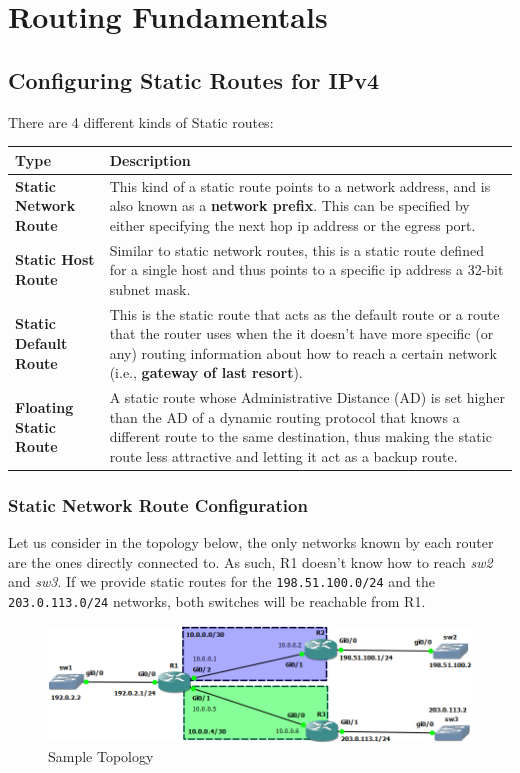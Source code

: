 \chapter{Routing Fundamentals}
\section{Configuring Static Routes for IPv4}
There are 4 different kinds of Static routes:

\vspace{-10pt}
\noindent
\begin{center}
	\begin{tabular}{lm{}}
		\toprule
		\textbf{Type} &\textbf{Description} \\
		\midrule
		\textbf{Static Network Route}	&This kind of a static route points to a network address, and is also known as a \textbf{network prefix}. This can be specified by either specifying the next hop ip address or the egress port.\\
		\textbf{Static Host Route}		&Similar to static network routes, this is a static route defined for a single host and thus points to a specific ip address a 32-bit subnet mask. \\
		\textbf{Static Default Route}	&This is the static route that acts as the default route or a route that the router uses when the it doesn't have more specific (or any) routing information about how to reach a certain network (i.e., \textbf{gateway of last resort}). \\
		\textbf{Floating Static Route}	&A static route whose Administrative Distance (AD) is set higher than the AD of a dynamic routing protocol that knows a different route to the same destination, thus making the static route less attractive and letting it act as a backup route.\\		
		\bottomrule
	\end{tabular}
\end{center}

\subsection{Static Network Route Configuration}
Let us consider in the topology below, the only networks known by each router are the ones directly connected to. As such, R1 doesn't know how to reach \textit{sw2} and \textit{sw3}. If we provide static routes for the \verb|198.51.100.0/24| and the \verb|203.0.113.0/24| networks, both switches will be reachable from R1. 
\begin{figure}[H]
\centering
\includegraphics[width=0.9\linewidth]{"ICND1/2. Routers/chapters/3.1.a Sample Topology"}
\caption{Sample Topology}
\label{fig:9.1.a}
\end{figure}
\vspace{-10pt}

